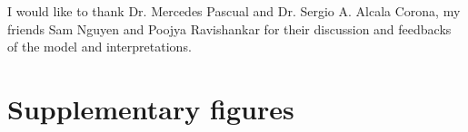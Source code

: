 \documentclass{svproc}
\begin{document}
I would like to thank Dr. Mercedes Pascual and Dr. Sergio A. Alcala Corona, my friends Sam Nguyen and Poojya Ravishankar for their discussion and feedbacks of the model and interpretations.




\vspace{-1em}

\section*{Supplementary figures}

\setcounter{figure}{0}
\renewcommand{\thefigure}{S\arabic{figure}}






\end{document}
